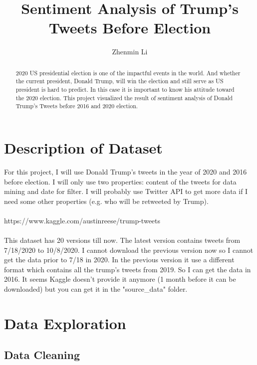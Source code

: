 \documentclass{article}
\begin{document}
\title{Sentiment Analysis of Trump's Tweets Before Election}
\author{Zhenmin Li}

\maketitle

\begin{abstract}
2020 US presidential election is one of the impactful events in the world. And whether the current president, Donald Trump, will win the election and still serve as US president is hard to predict. In this case it is important to know his attitude toward the 2020 election. This project visualized the result of sentiment analysis of Donald Trump's Tweets before 2016 and 2020 election. 
\end{abstract}

\section{Description of Dataset}

For this project, I will use Donald Trump’s tweets in the year of 2020 and 2016 before election. I will only use two properties: content of the tweets for data mining and date for filter. I will probably use Twitter API to get more data if I need some other properties (e.g. who will be retweeted by Trump).
\\ \hspace*{\fill} \\ 
https://www.kaggle.com/austinreese/trump-tweets
\\ \hspace*{\fill} \\
This dataset has 20 versions till now. The latest version contains tweets from 7/18/2020 to 10/8/2020. I cannot download the previous version now so I cannot get the data prior to 7/18 in 2020. In the previous version it use a different format which contains all the trump's tweets from 2019. So I can get the data in 2016. It seems Kaggle doesn't provide it anymore (1 month before it can be downloaded) but you can get it in the "source\_data" folder.


\section{Data Exploration}

\subsection{Data Cleaning}
\end{document}
